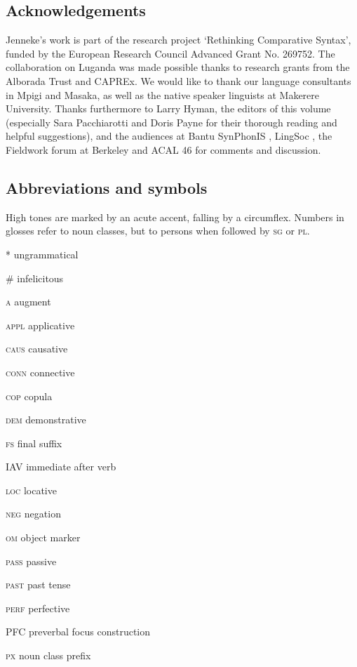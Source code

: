 \documentclass[output=paper]{langsci/langscibook}
\begin{document}
\subsection{ Acknowledgements}

Jenneke’s work is part of the research project ‘Rethinking Comparative Syntax’, funded by the European Research Council Advanced Grant No. 269752. The collaboration on Luganda was made possible thanks to research grants from the Alborada Trust and CAPREx. We would like to thank our language consultants in Mpigi and Masaka, as well as the native speaker linguists at Makerere University. Thanks furthermore to Larry Hyman, the editors of this volume (especially Sara Pacchiarotti and Doris Payne for their thorough reading and helpful suggestions), and the audiences at Bantu SynPhonIS \citep{November2014}, LingSoc \citep{February2015}, the Fieldwork forum at Berkeley \citep{February2015} and ACAL 46 \citep{March2015} for comments and discussion.

\subsection{ Abbreviations and symbols}

High tones are marked by an acute accent, falling by a circumflex. Numbers in glosses refer to noun classes, but to persons when followed by \textsc{sg} or \textsc{pl}.

*  ungrammatical

\#  infelicitous

\textsc{a}  augment

\textsc{appl}  applicative

\textsc{caus}  causative

\textsc{conn}  connective

\textsc{cop}  copula

\textsc{dem}  demonstrative

\textsc{fs}  final suffix

IAV  immediate after verb

\textsc{loc}  locative

\textsc{neg}  negation

\textsc{om}  object marker

\textsc{pass}  passive

\textsc{past}  past tense

\textsc{perf}  perfective

PFC  preverbal focus construction

\textsc{px}  noun class prefix
\end{document}
